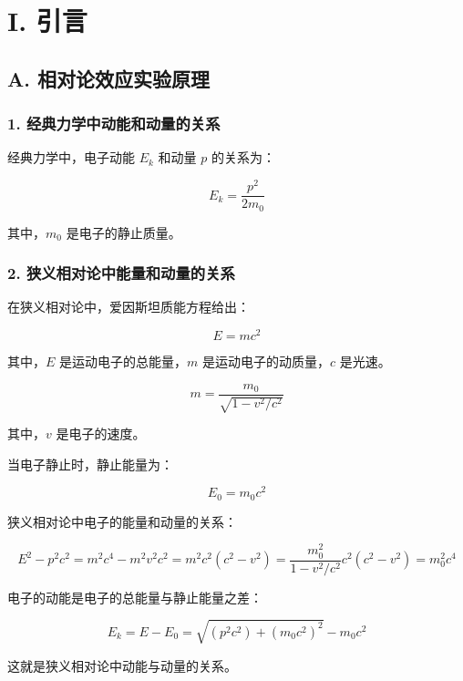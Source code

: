 \documentclass[aps,prl,preprint,groupedaddress]{revtex4-2}
\begin{document}
\section{I. 引言}
\subsection{A. 相对论效应实验原理}

\subsubsection{1. 经典力学中动能和动量的关系}

经典力学中，电子动能 $E_k$ 和动量 $p$ 的关系为：

$$
E_k = \frac{p^2}{2m_0}
$$

其中，$m_0$ 是电子的静止质量。

\subsubsection{2. 狭义相对论中能量和动量的关系}

在狭义相对论中，爱因斯坦质能方程给出：

$$
E = m c^2
$$

其中，$E$ 是运动电子的总能量，$m $ 是运动电子的动质量，$c $ 是光速。

$$
m = \frac{m_0}{\sqrt{1-v^2/c^2}}
$$

其中，$v$ 是电子的速度。

当电子静止时，静止能量为：

$$
E_0 = m_0 c^2
$$

狭义相对论中电子的能量和动量的关系：

$$
E^2-p^2c^2
=m^2 c^4-m^2v^2c^2
=m^2c^2(c^2-v^2)
=\frac{m_0^2}{1-v^2/c^2}c^2(c^2-v^2)
=m_0^2c^4
$$

电子的动能是电子的总能量与静止能量之差：

$$
E_k
=E-E_0
=\sqrt{(p^2c^2)+\left(m_0c^2\right)^2} - m_0c^2
$$

这就是狭义相对论中动能与动量的关系。
\end{document}
